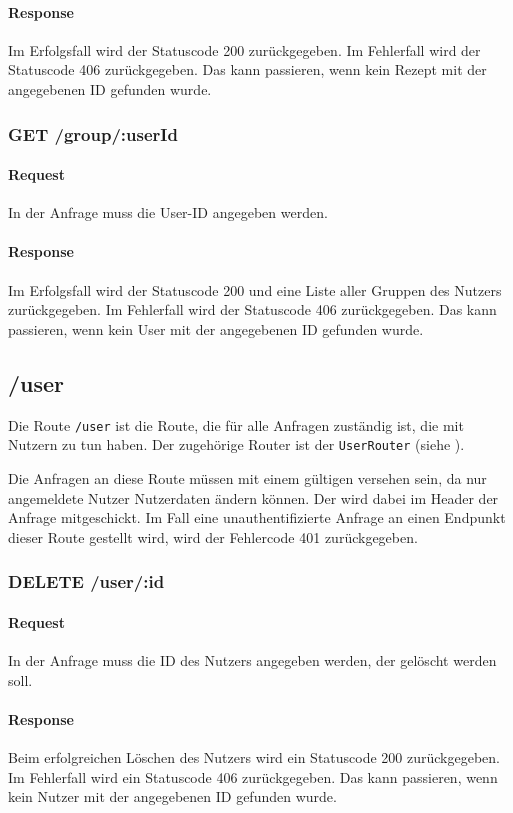 \documentclass{entwurfsheft}
\begin{document}
\begin{sloppypar}
    \paragraph{Response}
        Im Erfolgsfall wird der Statuscode 200 zurückgegeben.
        Im Fehlerfall wird der Statuscode 406 zurückgegeben. Das kann passieren, wenn kein Rezept mit der angegebenen ID gefunden wurde.
    
\subsubsection*{GET /group/:userId}
    \paragraph{Request}
        In der Anfrage muss die User-ID angegeben werden.
    \paragraph{Response}
        Im Erfolgsfall wird der Statuscode 200 und eine Liste aller Gruppen des Nutzers zurückgegeben. Im Fehlerfall wird der Statuscode 406 zurückgegeben. Das kann passieren, wenn kein User mit der angegebenen ID gefunden wurde.

\subsection{/user}
Die Route \texttt{/user} ist die Route, die für alle Anfragen zuständig ist, die mit Nutzern zu tun haben.
Der zugehörige Router ist der \texttt{UserRouter} (siehe ).

Die Anfragen an diese Route müssen mit einem gültigen  versehen sein, da nur angemeldete Nutzer Nutzerdaten ändern können.
Der  wird dabei im Header der Anfrage mitgeschickt.
Im Fall eine unauthentifizierte Anfrage an einen Endpunkt dieser Route gestellt wird, wird der Fehlercode 401 zurückgegeben.

\subsubsection*{DELETE /user/:id}
\paragraph{Request}
In der Anfrage muss die ID des Nutzers angegeben werden, der gelöscht werden soll.
\paragraph{Response}
Beim erfolgreichen Löschen des Nutzers wird ein Statuscode 200 zurückgegeben.
Im Fehlerfall wird ein Statuscode 406 zurückgegeben. Das kann passieren, wenn kein Nutzer mit der angegebenen ID gefunden wurde.


\end{sloppypar}
\end{document}
